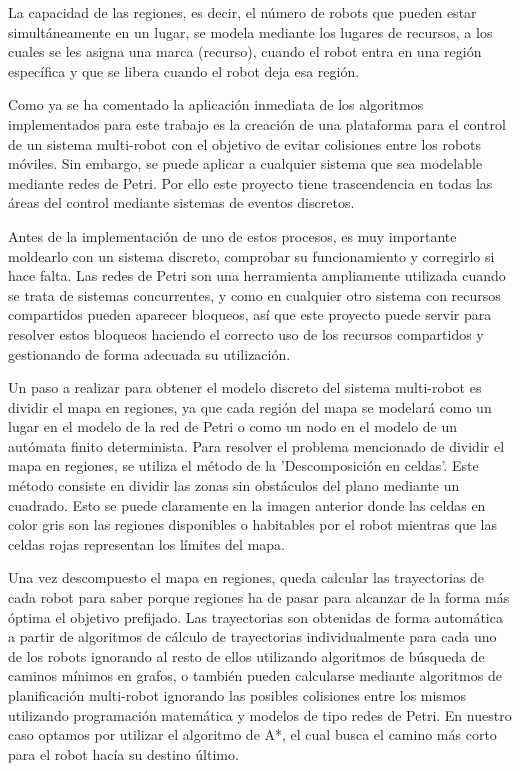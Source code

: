 La capacidad de las regiones, es decir, el número de robots que pueden estar simultáneamente en un lugar, se modela mediante los lugares de recursos, a los cuales se les asigna una marca (recurso), cuando el robot entra en una región específica y que se libera cuando el robot deja esa región.

Como ya se ha comentado la aplicación inmediata de los algoritmos implementados para este trabajo es la creación de una plataforma para el control de un sistema multi-robot con el objetivo de evitar colisiones entre los robots móviles. Sin embargo, se puede aplicar a cualquier sistema que sea modelable mediante redes de Petri. Por ello este proyecto tiene trascendencia en todas las áreas del control mediante sistemas de eventos discretos.

Antes de la implementación de uno de estos procesos, es muy importante moldearlo con un sistema discreto, comprobar su funcionamiento y corregirlo si hace falta. Las redes de Petri son una herramienta ampliamente utilizada cuando se trata de sistemas concurrentes, y como en cualquier otro sistema con recursos compartidos pueden aparecer bloqueos, así que este proyecto puede servir para resolver estos bloqueos haciendo el correcto uso de los recursos compartidos y gestionando de forma adecuada su utilización.

Un paso a realizar para obtener el modelo discreto del sistema multi-robot es dividir el mapa en regiones, ya que cada región del mapa se modelará como un lugar en el modelo de la red de Petri o como un nodo en el modelo de un autómata finito determinista. Para resolver el problema mencionado de dividir el mapa en regiones, se utiliza el método de la 'Descomposición en celdas'. Este método consiste en dividir las zonas sin obstáculos del plano mediante un cuadrado. Esto se puede claramente en la imagen anterior donde las celdas en color gris son las regiones disponibles o habitables por el robot mientras que las celdas rojas representan los límites del mapa.

Una vez descompuesto el mapa en regiones, queda calcular las trayectorias de cada robot para saber porque regiones ha de pasar para alcanzar de la forma más óptima el objetivo prefijado. Las trayectorias son obtenidas de forma automática a partir de algoritmos de cálculo de trayectorias individualmente para cada uno de los robots ignorando al resto de ellos utilizando algoritmos de búsqueda de caminos mínimos en grafos, o también pueden calcularse mediante algoritmos de planificación multi-robot ignorando las posibles colisiones entre los mismos utilizando programación matemática y modelos de tipo redes de Petri. En nuestro caso optamos por utilizar el algoritmo de A*, el cual busca el camino más corto para el robot hacía su destino último.

